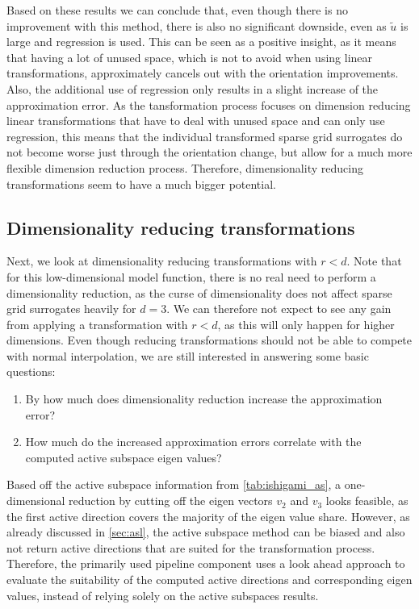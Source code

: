 \documentclass[
  a4paper,  %
  twoside,  %
  bibliography=totoc,
  headsepline,
  cleardoublepage=empty,
  parskip=half,
  draft=false
]{scrbook}
\begin{document}
Based on these results we can conclude that, even though there is no improvement with this method, there is also no significant downside, even as $\tilde{u}$ is large and regression is used.
This can be seen as a positive insight, as it means that having a lot of unused space, which is not to avoid when using linear transformations, approximately cancels out with the orientation improvements.
Also, the additional use of regression only results in a slight increase of the approximation error.
As the tansformation process focuses on dimension reducing linear transformations that have to deal with unused space and can only use regression, this means that the individual transformed sparse grid surrogates do not become worse just through the orientation change, but allow for a much more flexible dimension reduction process.
Therefore, dimensionality reducing transformations seem to have a much bigger potential.

\subsection{Dimensionality reducing transformations}

Next, we look at dimensionality reducing transformations with $r < d$.
Note that for this low-dimensional model function, there is no real need to perform a dimensionality reduction, as the curse of dimensionality does not affect sparse grid surrogates heavily for $d=3$.
We can therefore not expect to see any gain from applying a transformation with $r < d$, as this will only happen for higher dimensions.
Even though reducing transformations should not be able to compete with normal interpolation, we are still interested in answering some basic questions:
\begin{enumerate}
\item By how much does dimensionality reduction increase the approximation error?
\item How much do the increased approximation errors correlate with the computed active subspace eigen values?
\end{enumerate}
%
Based off the active subspace information from \cref{tab:ishigami_as}, a one-dimensional reduction by cutting off the eigen vectors $v_2$ and $v_3$ looks feasible, as the first active direction covers the majority of the eigen value share.
However, as already discussed in \cref{sec:asl}, the active subspace method can be biased and also not return active directions that are suited for the transformation process.
Therefore, the primarily used pipeline component uses a look ahead approach to evaluate the suitability of the computed active directions and corresponding eigen values, instead of relying solely on the active subspaces results.
\end{document}
